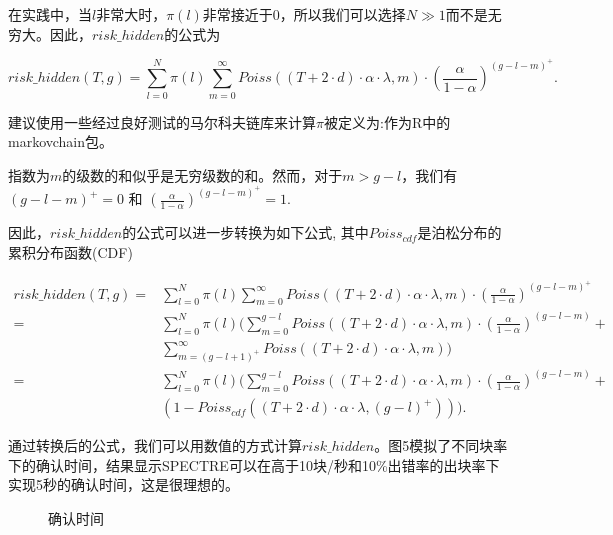 \documentclass[a4paper,11pt]{article}
\begin{document}
在实践中，当$l$非常大时，$\pi(l)$非常接近于0，所以我们可以选择$N \gg 1$而不是无穷大。因此，$risk\_hidden$的公式为

$$
risk\_hidden(T,g) = \sum_{l=0}^{N} \pi(l) \sum_{m=0}^{\infty} Poiss((T + 2 \cdot
d) \cdot \alpha \cdot \lambda, m) \cdot \left(\frac{\alpha}{1-\alpha}\right)^{(g
- l - m)^+}.
$$

建议使用一些经过良好测试的马尔科夫链库来计算$\pi$被定义为:作为R中的markovchain包。

指数为$m$的级数的和似乎是无穷级数的和。然而，对于$m > g - l$，我们有$(g - l - m)^+ = 0$ 和 
$\left(\frac{\alpha}{1-\alpha}\right)^{(g - l - m)^+} = 1$.

因此，$risk\_hidden$的公式可以进一步转换为如下公式, 其中$Poiss_{cdf}$是泊松分布的累积分布函数(CDF)

\begin{align*}
risk\_hidden(T,g)
=& \sum_{l=0}^{N}\pi(l)\sum_{m=0}^{\infty}Poiss((T+2 \cdot d) \cdot \alpha \cdot \lambda, m) \cdot (\frac{\alpha}{1-\alpha})^{(g-l-m)^+} \\
=& \sum_{l=0}^{N}\pi(l) (\sum_{m=0}^{g-l}Poiss((T+2 \cdot d) \cdot \alpha
	\cdot \lambda, m) \cdot (\frac{\alpha}{1-\alpha})^{(g-l-m)} + \\
& \sum_{m=(g-l+1)^+}^{\infty}Poiss((T+2 \cdot d) \cdot \alpha \cdot \lambda, m)) \\
=& \sum_{l=0}^{N}\pi(l) ( \sum_{m=0}^{g-l}Poiss((T+2 \cdot d) \cdot
	\alpha \cdot \lambda, m) \cdot (\frac{\alpha}{1-\alpha})^{(g-l-m)} + \\
& (1 - Poiss_{cdf} ((T+2 \cdot d) \cdot \alpha \cdot \lambda, (g-l)^+))).
\end{align*}

通过转换后的公式，我们可以用数值的方式计算$risk\_hidden$。图5模拟了不同块率下的确认时间，结果显示SPECTRE可以在高于10块/秒和10\%出错率的出块率下实现5秒的确认时间，这是很理想的。

\begin{figure}[ht]
	\centerline{%
	}
\caption{确认时间}
\end{figure}
\end{document}
